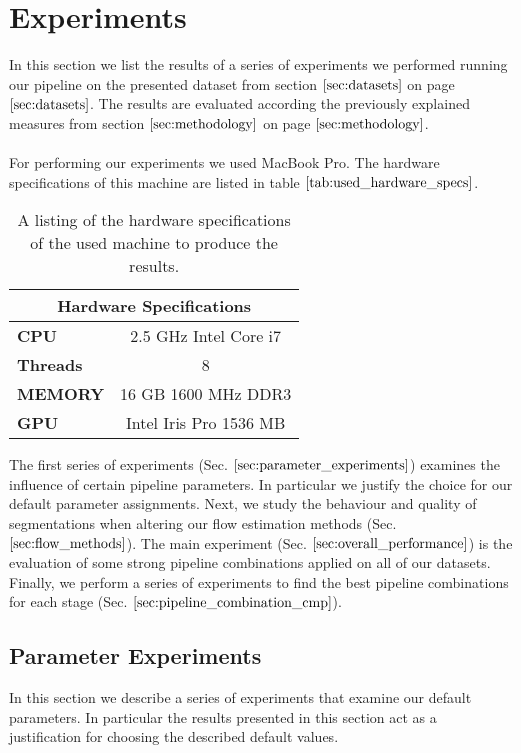 \section{Experiments}
In this section we list the results of a series of experiments we performed running our pipeline on the presented dataset from section $\ref{sec:datasets}$ on page $\pageref{sec:datasets}$. The results are evaluated according the previously explained measures from section $\ref{sec:methodology}$ on page $\pageref{sec:methodology}$. \\ \\
For performing our experiments we used MacBook Pro. The hardware specifications of this machine are listed in table $\ref{tab:used_hardware_specs}$. 
\begin{table}[H]
\centering
\begin{tabular}{|l|c|}
\hline
\multicolumn{2}{|c|}{\textbf{Hardware Specifications}} \\ \hline
\textbf{CPU} & 2.5 GHz Intel Core i7 \\ \hline
\textbf{Threads} & 8 \\ \hline
\textbf{MEMORY} & 16 GB 1600 MHz DDR3 \\ \hline
\textbf{GPU} & Intel Iris Pro 1536 MB \\ \hline
\end{tabular}
\caption{A listing of the hardware specifications of the used machine to produce the results.}
\label{tab:used_hardware_specs}
\end{table}
The first series of experiments (Sec. $\ref{sec:parameter_experiments}$) examines the influence of certain pipeline parameters. In particular we justify the choice for our default parameter assignments. Next, we study the behaviour and quality of segmentations when altering our flow estimation methods (Sec. $\ref{sec:flow_methods}$). The main experiment (Sec. $\ref{sec:overall_performance}$) is the evaluation of some strong pipeline combinations applied on all of our datasets. Finally, we perform a series of experiments to find the best pipeline combinations for each stage (Sec. $\ref{sec:pipeline_combination_cmp}$).

\subsection{Parameter Experiments}
\label{sec:parameter_experiments}
In this section we describe a series of experiments that examine our default parameters. In particular the results presented in this section act as a justification for choosing the described default values.

